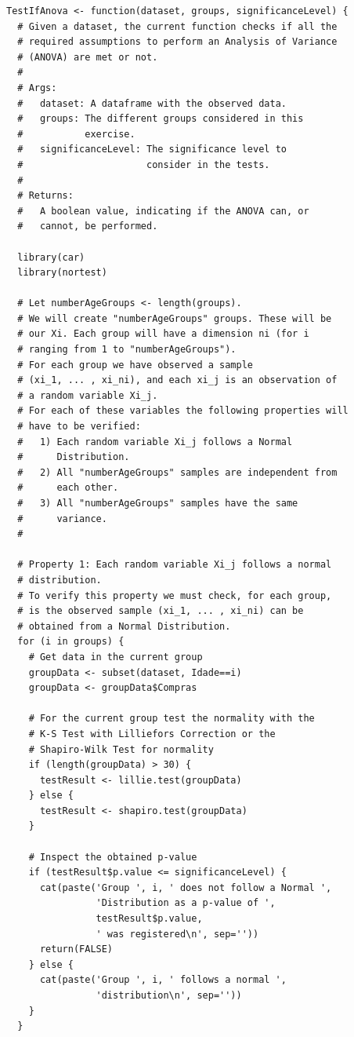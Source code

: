 \documentclass[12pt]{article}
\begin{document}
\begin{lstlisting}
TestIfAnova <- function(dataset, groups, significanceLevel) {
  # Given a dataset, the current function checks if all the
  # required assumptions to perform an Analysis of Variance
  # (ANOVA) are met or not.
  #
  # Args:
  #   dataset: A dataframe with the observed data.
  #   groups: The different groups considered in this
  #           exercise.
  #   significanceLevel: The significance level to
  #                      consider in the tests.
  #
  # Returns:
  #   A boolean value, indicating if the ANOVA can, or
  #   cannot, be performed.

  library(car)
  library(nortest)

  # Let numberAgeGroups <- length(groups).
  # We will create "numberAgeGroups" groups. These will be
  # our Xi. Each group will have a dimension ni (for i
  # ranging from 1 to "numberAgeGroups").
  # For each group we have observed a sample
  # (xi_1, ... , xi_ni), and each xi_j is an observation of
  # a random variable Xi_j.
  # For each of these variables the following properties will
  # have to be verified:
  #   1) Each random variable Xi_j follows a Normal
  #      Distribution.
  #   2) All "numberAgeGroups" samples are independent from
  #      each other.
  #   3) All "numberAgeGroups" samples have the same
  #      variance.
  #

  # Property 1: Each random variable Xi_j follows a normal
  # distribution.
  # To verify this property we must check, for each group,
  # is the observed sample (xi_1, ... , xi_ni) can be
  # obtained from a Normal Distribution.
  for (i in groups) {
    # Get data in the current group
    groupData <- subset(dataset, Idade==i)
    groupData <- groupData$Compras

    # For the current group test the normality with the
    # K-S Test with Lilliefors Correction or the
    # Shapiro-Wilk Test for normality
    if (length(groupData) > 30) {
      testResult <- lillie.test(groupData)
    } else {
      testResult <- shapiro.test(groupData)
    }

    # Inspect the obtained p-value
    if (testResult$p.value <= significanceLevel) {
      cat(paste('Group ', i, ' does not follow a Normal ',
                'Distribution as a p-value of ',
                testResult$p.value,
                ' was registered\n', sep=''))
      return(FALSE)
    } else {
      cat(paste('Group ', i, ' follows a normal ',
                'distribution\n', sep=''))
    }
  }


\end{lstlisting}
\end{document}
